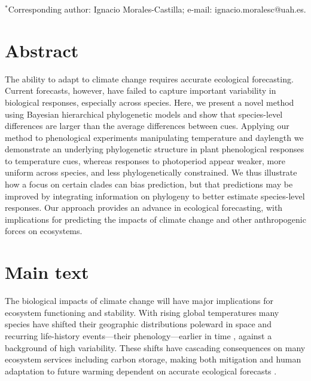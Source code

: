 \documentclass[11pt]{article}
\begin{document}
\vspace{2ex}
$^*$Corresponding author: Ignacio Morales-Castilla; e-mail: ignacio.moralesc@uah.es.\\


\renewcommand{\thetable}{\arabic{table}}
\renewcommand{\thefigure}{\arabic{figure}}
\renewcommand{\labelitemi}{$-$}




\linenumbers
\section*{Abstract} %
The ability to adapt to climate change requires accurate ecological forecasting. Current forecasts, however, have failed to capture important variability in biological responses, especially across species. Here, we present a novel method using Bayesian hierarchical phylogenetic models and show that species-level differences are larger than the average differences between cues. Applying our method to phenological experiments manipulating temperature and daylength we demonstrate an underlying phylogenetic structure in plant phenological responses to temperature cues, whereas responses to photoperiod appear weaker, more uniform across species, and less phylogenetically constrained. We thus illustrate how a focus on certain clades can bias prediction, but that predictions may be improved by integrating information on phylogeny to better estimate species-level responses. Our approach provides an advance in ecological forecasting, with implications for predicting the impacts of climate change and other anthropogenic forces on ecosystems.

\clearpage






\section*{Main text}
\par The biological impacts of climate change will have major implications for ecosystem functioning and stability. With rising global temperatures many species have shifted their geographic distributions poleward in space and recurring life-history events---their phenology---earlier in time \citep{IPCC:2014sm,parmesan2003}, against a background of high variability. These shifts have cascading consequences on many ecosystem services including carbon storage, making both mitigation and human adaptation to future warming dependent on accurate ecological forecasts \citep{richardson2013}. 
\end{document}
